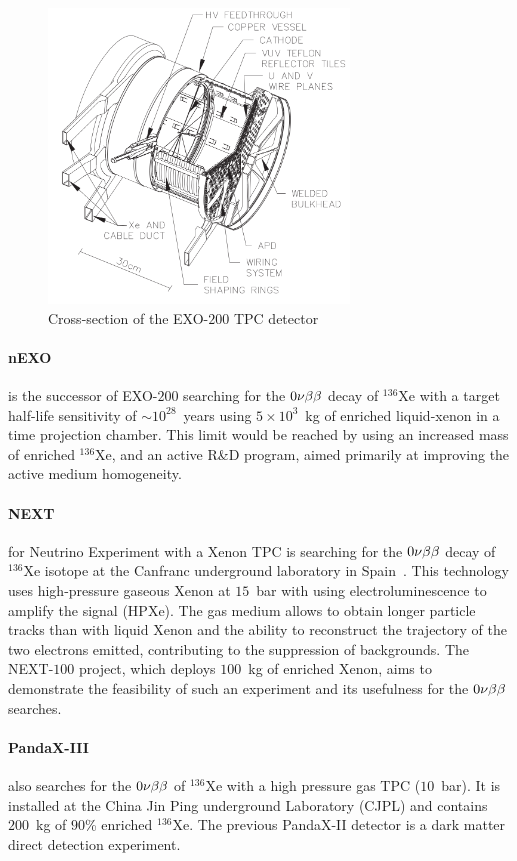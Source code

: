\begin{figure}
  \centering
  \includegraphics[width=8cm]{neutrinophysics/fig_neutrinophysics/EXO-200.png}
  \caption{Cross-section of the EXO-$200$ TPC detector
    \label{fig:EXO-200}}
\end{figure}

\paragraph{nEXO} is the successor of EXO-$200$ searching for the $0\nu\beta\beta$ decay of $^{136}$Xe with a target half-life sensitivity of $\sim 10^{28}$~years using $5\times 10^3$~kg of enriched liquid-xenon in a time projection chamber.
This limit would be reached by using an increased mass of enriched $^{136}$Xe, and an active R\&D program, aimed primarily at improving the active medium homogeneity.

\paragraph{NEXT} for Neutrino Experiment with a Xenon TPC is searching for the $0\nu\beta\beta$ decay of $^{136}$Xe isotope at the Canfranc underground laboratory in Spain~\cite{art:NEXT_2016}.
This technology uses high-pressure gaseous Xenon at $15$~bar with using electroluminescence to amplify the signal (HPXe).
The gas medium allows to obtain longer particle tracks than with liquid Xenon and the ability to reconstruct the trajectory of the two electrons emitted, contributing to the suppression of backgrounds.
The NEXT-$100$ project, which deploys $100$~kg of enriched Xenon, aims to demonstrate the feasibility of such an experiment and its usefulness for the $0\nu\beta\beta$ searches.


\paragraph{PandaX-III} also searches for the $0\nu\beta\beta$ of $^{136}$Xe with a high pressure gas TPC ($10$~bar).
It is installed at the China Jin Ping underground Laboratory (CJPL) and contains $200$~kg of $90$\% enriched $^{136}$Xe.
The previous PandaX-II detector is a dark matter direct detection experiment.

